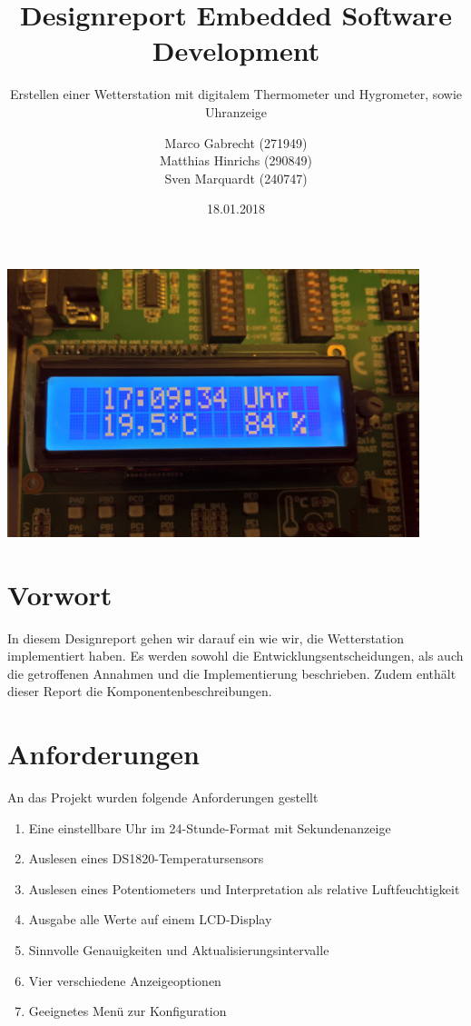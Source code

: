 \documentclass[10pt]{scrartcl}
\title{Designreport Embedded Software Development}
\subtitle{Erstellen einer Wetterstation mit digitalem Thermometer und Hygrometer, sowie Uhranzeige}
\author{Marco Gabrecht (271949)\\Matthias Hinrichs (290849)\\Sven Marquardt (240747)}
\date{18.01.2018}
\begin{document}
\maketitle
\vfill
\begin{center}
\includegraphics[width=0.9\textwidth]{img/designreport-title-hq.jpg}
\end{center}
\vfill
\newpage
\tableofcontents
\newpage
\section{Vorwort}
In diesem Designreport gehen wir darauf ein wie wir, die Wetterstation implementiert haben. Es werden sowohl die Entwicklungsentscheidungen, als auch die getroffenen Annahmen und die Implementierung beschrieben. Zudem enthält dieser Report die Komponentenbeschreibungen.
\section{Anforderungen}
An das Projekt wurden folgende Anforderungen gestellt
\begin{enumerate}
\item Eine einstellbare Uhr im 24-Stunde-Format mit Sekundenanzeige
\item Auslesen eines DS1820-Temperatursensors
\item Auslesen eines Potentiometers und Interpretation als relative Luftfeuchtigkeit
\item Ausgabe alle Werte auf einem LCD-Display
\item Sinnvolle Genauigkeiten und Aktualisierungsintervalle
\item Vier verschiedene Anzeigeoptionen
\item Geeignetes Menü zur Konfiguration
\end{enumerate}
\end{document}
